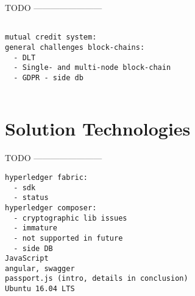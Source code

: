 TODO ------------------------

\begin{verbatim}

mutual credit system:
general challenges block-chains:
  - DLT
  - Single- and multi-node block-chain
  - GDPR - side db
  
\end{verbatim}
  
\section{Solution Technologies}
\label{sec:solution}

TODO ------------------------

\begin{verbatim}
hyperledger fabric:
  - sdk
  - status
hyperledger composer:
  - cryptographic lib issues
  - immature
  - not supported in future
  - side DB
JavaScript
angular, swagger
passport.js (intro, details in conclusion)
Ubuntu 16.04 LTS
\end{verbatim}